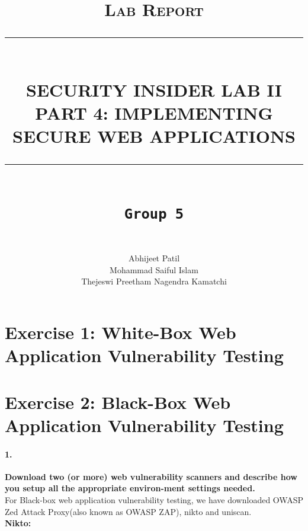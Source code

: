 \documentclass[12pt]{report}
\newcommand{\HRule}[1]{\rule{\linewidth}{#1}}
\begin{document}
	
	\title{ \normalsize \textsc{Lab Report}
		\\ [2.0cm]
		\HRule{0.5pt} \\
		\LARGE \textbf{\uppercase{Security Insider Lab II \\
				Part 4: Implementing Secure Web Applications}}
		\HRule{2pt} \\ [0.5cm]
		\normalsize \vspace*{4\baselineskip}
		\LARGE {\tt Group 5}\\}
	\date{}
	\author{
		 \\
		Abhijeet Patil \\
		Mohammad Saiful Islam\\
		Thejeswi Preetham Nagendra Kamatchi}
	\maketitle
	\newpage
	
	
	\section*{Exercise 1: White-Box Web Application Vulnerability Testing}
	\newpage
	
	\section*{Exercise 2: Black-Box Web Application Vulnerability Testing}
	
	\paragraph*{1.}{\bf Download two (or more) web vulnerability scanners and describe how you setup all the appropriate environ-ment settings needed.}\\
	
	For Black-box web application vulnerability testing, we have downloaded OWASP Zed Attack Proxy(also known as OWASP ZAP), nikto and uniscan.\\
	
	{\bf Nikto:} 
	
\end{document}
